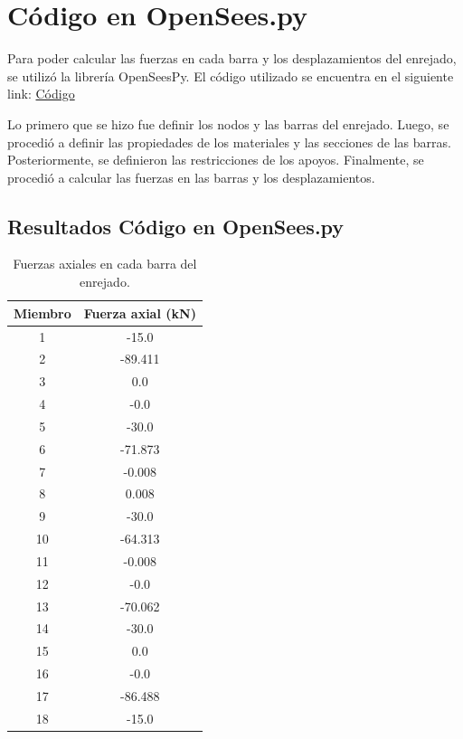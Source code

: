 \documentclass{article}  %
\begin{document}
\newpage
\section{Código en OpenSees.py}
Para poder calcular las fuerzas en cada barra y los desplazamientos del enrejado, se utilizó la librería OpenSeesPy. El código utilizado se encuentra en el siguiente link: \href{https://github.com/berckanala/P2E0_MCOC/tree/main/c%C3%B3digo}{Código}

Lo primero que se hizo fue definir los nodos y las barras del enrejado. Luego, se procedió a definir las propiedades de los materiales y las secciones de las barras. Posteriormente, se definieron las restricciones de los apoyos. Finalmente, se procedió a calcular las fuerzas en las barras y los desplazamientos.

\subsection{Resultados Código en OpenSees.py}
\begin{table}[h!]
  \centering
  \begin{tabular}{|c|c|}
  \hline
  \textbf{Miembro} & \textbf{Fuerza axial (kN)} \\
  \hline
  1  & -15.0   \\
  2  & -89.411 \\
  3  & 0.0     \\
  4  & -0.0    \\
  5  & -30.0   \\
  6  & -71.873 \\
  7  & -0.008  \\
  8  & 0.008   \\
  9  & -30.0   \\
  10 & -64.313 \\
  11 & -0.008  \\
  12 & -0.0    \\
  13 & -70.062 \\
  14 & -30.0   \\
  15 & 0.0     \\
  16 & -0.0    \\
  17 & -86.488 \\
  18 & -15.0   \\
  \hline
  \end{tabular}
  \caption{Fuerzas axiales en cada barra del enrejado.}
  \label{tab:2}
\end{table}
\end{document}
